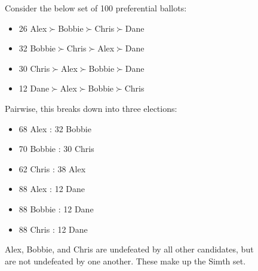 \begin{figure}
    \begin{election}
        \singlespacing
        \label{ele:smith-set}
        Consider the below set of 100 preferential ballots:
        \begin{itemize}
            \item 26 Alex$\succ$Bobbie$\succ$Chris$\succ$Dane
            \item 32 Bobbie$\succ$Chris$\succ$Alex$\succ$Dane
            \item 30 Chris$\succ$Alex$\succ$Bobbie$\succ$Dane
            \item 12 Dane$\succ$Alex$\succ$Bobbie$\succ$Chris
        \end{itemize}

        Pairwise, this breaks down into three elections:

        \begin{itemize}
            \item 68 Alex : 32 Bobbie
            \item 70 Bobbie : 30 Chris
            \item 62 Chris : 38 Alex
            \item 88 Alex : 12 Dane
            \item 88 Bobbie : 12 Dane
            \item 88 Chris : 12 Dane
        \end{itemize}

        Alex, Bobbie, and Chris are undefeated by all other candidates, but are not undefeated by one another.  These make up the Simth set.
    \end{election}
\end{figure}

%
%
%
%
%

